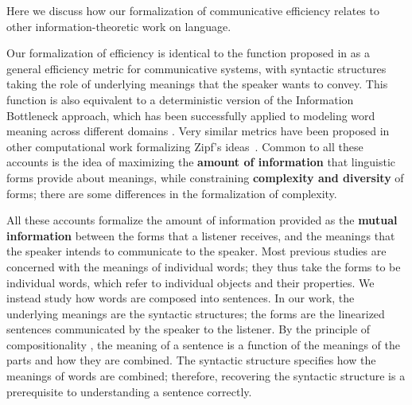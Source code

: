 \documentclass[10pt,twoside,lineno]{article}
\newcommand{\key}[1]{\textbf{#1}}
\begin{document}
Here we discuss how our formalization of communicative efficiency relates to other information-theoretic work on language.

Our formalization of efficiency is identical to the function proposed in \cite{ferreri2003least,ferrericancho2007global,futrell2017memory,peloquin2019interactions} as a general efficiency metric for communicative systems, with syntactic structures taking the role of underlying meanings that the speaker wants to convey.
This function is also equivalent to a deterministic version \cite{strouse2017deterministic} of the Information Bottleneck approach, which has been successfully applied to modeling word meaning across different domains \cite{zaslavsky2018efficient, zaslavsky2019semantic}.
Very similar metrics have been proposed in other computational work formalizing Zipf's ideas~\cite{frank2012predicting,zaslavsky2018efficient,kemp2012kinship,regier2015word,goodman2013knowledge,piantadosi2012communicative}.
Common to all these accounts is the idea of maximizing the \key{amount of information} that linguistic forms provide about meanings, while constraining \key{complexity and diversity} of forms; there are some differences in the formalization of complexity.

All these accounts formalize the amount of information provided as the \key{mutual information} between the forms that a listener receives, and the meanings that the speaker intends to communicate to the speaker.
Most previous studies \cite{ferreri2003least, kemp2012kinship,regier2015word,zaslavsky2018efficient} are concerned with the meanings of individual words; they thus take the forms to be individual words, which refer to individual objects and their properties.
We instead study how words are composed into sentences.
In our work, the underlying meanings are the syntactic structures; the forms are the linearized sentences communicated by the speaker to the listener.
By the principle of compositionality \cite{frege1892sinn}, the meaning of a sentence is a function of the meanings of the parts and how they are combined.
The syntactic structure specifies how the meanings of words are combined; therefore, recovering the syntactic structure is a prerequisite to understanding a sentence correctly.
\end{document}
